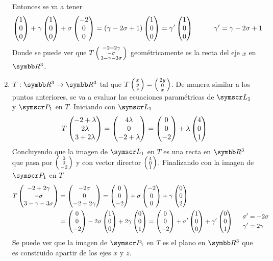 \begin{enumerate}[label=\listAlph]
            Entonces se va a tener
            \[
                \fvec{1,0,0} + \gamma \fvec{1,0,0} + \sigma \fvec{-2,0,0}
                = \left(\gamma - 2\sigma + 1\right) \fvec{1,0,0}
                = \gamma'\fvec{1,0,0}
                \hspace{1cm}
                \gamma' = \gamma - 2\sigma + 1
            \]
            Donde se puede ver que \(T\fsmvec{-2 + 2\gamma, -\sigma, 3 -\gamma -3\sigma}\) geométricamente es la recta del eje \(x\) en \(\realR^3\).
        \setcounter{enumii}{3}
        \item \(T: \realR^3 \rightarrow \realR^3\) tal que \(T\fsmvec{x,y,z}=\fsmvec{2y,0,x}\).
            De manera similar a los puntos anteriores, se va a evaluar las ecuaciones paramétricas de \(\fl_1\) y \(\fp_1\) en \(T\).
            Iniciando con \(\fl_1\)
            \[
                T\fvec{-2 + \lambda, 2\lambda, 3 + 2\lambda}
                = \fvec{4\lambda, 0, -2 + \lambda}
                = \fvec{0,0,-2} + \lambda \fvec{4,0,1}
            \]
            Concluyendo que la imagen de \(\fl_1\) en \(T\) es una recta en \(\realR^3\) que pasa por \(\fsmvec{0,0,-2}\) y con vector director \(\fsmvec{4,0,1}\).
            Finalizando con la imagen de \(\fp_1\) en \(T\)
            \[
                \begin{aligned}
                    T\fvec{-2 + 2\gamma, -\sigma, 3 -\gamma -3\sigma}
                    &= \fvec{-2\sigma, 0, -2 + 2\gamma} = \fvec{0,0,-2} + \sigma \fvec{-2,0,0} + \gamma \fvec{0,0,2} \\
                    &= \fvec{0,0,-2} -2\sigma \fvec{1,0,0} + 2\gamma \fvec{0,0,1} 
                    = \fvec{0,0,-2} + \sigma' \fvec{1,0,0} + \gamma' \fvec{0,0,1}
                    \hspace{0.5cm}
                    \begin{aligned}
                        \sigma' &= -2\sigma \\
                        \gamma' &= 2\gamma
                    \end{aligned}
                \end{aligned}
            \]
            Se puede ver que la imagen de \(\fp_1\) en \(T\) es el plano en \(\realR^3\) que es construido apartir de los ejes \(x\) y \(z\).
    \end{enumerate}
